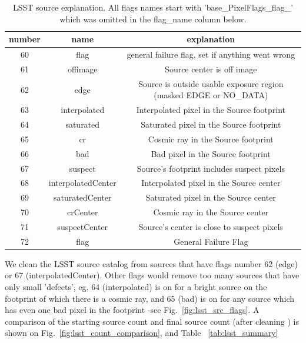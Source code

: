 \documentclass[DM,lsstdraft,toc,usenatbib]{lsstdoc}
\begin{document}
\begin{table}
\centering
\caption{LSST source explanation. All flags names start with 'base\_PixelFlags\_flag\_' which was omitted in the flag\_name column below. }
\label{tab:lsst_src_flags}
\begin{tabular}{ccc}
\hline
number & name & explanation \\
\hline
60 & flag & general failure flag, set if anything went wrong \\
61 & offimage & Source center is off image \\
62 & edge & Source is outside usable exposure region (masked EDGE or NO\_DATA) \\
63 & interpolated & Interpolated pixel in the Source footprint \\
64 & saturated & Saturated pixel in the Source footprint \\
65 & cr & Cosmic ray in the Source footprint \\
66 & bad & Bad pixel in the Source footprint \\
67 & suspect & Source's footprint includes suspect pixels \\
68 & interpolatedCenter & Interpolated pixel in the Source center \\
69 & saturatedCenter & Saturated pixel in the Source center \\
70 & crCenter & Cosmic ray in the Source center \\
71 & suspectCenter & Source's center is close to suspect pixels \\
72 & flag & General Failure Flag \\
\hline
\end{tabular}
\end{table}

We clean the LSST source catalog from sources that have flags number 62 (edge) or 67 (interpolatedCenter). Other flags would remove too many sources that have only small 'defects', eg. 64 (interpolated) is on for a bright source on the footprint of which there is a cosmic ray, and 65 (bad) is on for any source which has even one bad pixel in the footprint -see Fig.~\ref{fig:lsst_src_flags}. A comparison of the starting source count and final source count (after cleaning ) is shown on Fig.~\ref{fig:lsst_count_comparison}, and Table ~\ref{tab:lsst_summary}
\end{document}
